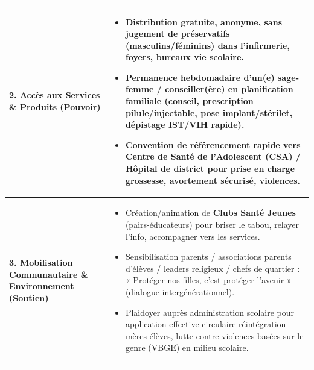 \documentclass[11pt]{article}
\begin{document}
\begin{corrige}
\begin{enumerate}[itemsep=6pt]
\begin{center}
\begin{tabularx}{\linewidth}{|l|X|}
\textbf{2. Accès aux Services \& Produits (Pouvoir)} & \begin{itemize}\item Distribution gratuite, anonyme, sans jugement de préservatifs (masculins/féminins) dans l'infirmerie, foyers, bureaux vie scolaire. \item Permanence hebdomadaire d'un(e) sage-femme / conseiller(ère) en planification familiale (conseil, prescription pilule/injectable, pose implant/stérilet, dépistage IST/VIH rapide). \item Convention de référencement rapide vers Centre de Santé de l'Adolescent (CSA) / Hôpital de district pour prise en charge grossesse, avortement sécurisé, violences. \end{itemize} \\ \hline
\textbf{3. Mobilisation Communautaire \& Environnement (Soutien)} & \begin{itemize}\item Création/animation de \textbf{Clubs Santé Jeunes} (pairs-éducateurs) pour briser le tabou, relayer l'info, accompagner vers les services. \item Sensibilisation parents / associations parents d'élèves / leaders religieux / chefs de quartier : « Protéger nos filles, c'est protéger l'avenir » (dialogue intergénérationnel). \item Plaidoyer auprès administration scolaire pour application effective circulaire réintégration mères élèves, lutte contre violences basées sur le genre (VBGE) en milieu scolaire. \end{itemize} \\ \hline
\end{tabularx}
\end{center}
\end{enumerate}
\end{corrige}
\end{document}
